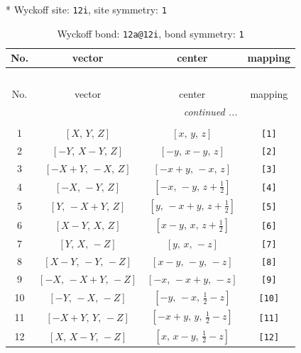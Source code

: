 \documentclass[fleqn,8pt]{jsarticle}
\begin{document}
* Wyckoff site: {\tt 12i}, site symmetry: {\tt 1}
\renewcommand{\arraystretch}{1.2}
\begin{longtable}{cccc}
\caption{Wyckoff bond: {\tt 12a@12i}, bond symmetry: {\tt 1}}
 \\
 \hline \hline
No. & vector & center & mapping \\ \hline \endfirsthead

\multicolumn{3}{l}{\tablename\ \thetable{}} \\
 \hline \hline
No. & vector & center & mapping \\ \hline \endhead

 \hline \hline
\multicolumn{3}{r}{\footnotesize\it continued ...} \\ \endfoot

 \hline \hline
\multicolumn{3}{r}{} \\ \endlastfoot

1 & $\left[ X,\, Y,\, Z \right]$ & $\left[ x,\, y,\, z \right]$ & {\tt [1]} \\ \hline
2 & $\left[ - Y,\, X - Y,\, Z \right]$ & $\left[ - y,\, x - y,\, z \right]$ & {\tt [2]} \\ \hline
3 & $\left[ - X + Y,\, - X,\, Z \right]$ & $\left[ - x + y,\, - x,\, z \right]$ & {\tt [3]} \\ \hline
4 & $\left[ - X,\, - Y,\, Z \right]$ & $\left[ - x,\, - y,\, z + \frac{1}{2} \right]$ & {\tt [4]} \\ \hline
5 & $\left[ Y,\, - X + Y,\, Z \right]$ & $\left[ y,\, - x + y,\, z + \frac{1}{2} \right]$ & {\tt [5]} \\ \hline
6 & $\left[ X - Y,\, X,\, Z \right]$ & $\left[ x - y,\, x,\, z + \frac{1}{2} \right]$ & {\tt [6]} \\ \hline
7 & $\left[ Y,\, X,\, - Z \right]$ & $\left[ y,\, x,\, - z \right]$ & {\tt [7]} \\ \hline
8 & $\left[ X - Y,\, - Y,\, - Z \right]$ & $\left[ x - y,\, - y,\, - z \right]$ & {\tt [8]} \\ \hline
9 & $\left[ - X,\, - X + Y,\, - Z \right]$ & $\left[ - x,\, - x + y,\, - z \right]$ & {\tt [9]} \\ \hline
10 & $\left[ - Y,\, - X,\, - Z \right]$ & $\left[ - y,\, - x,\, \frac{1}{2} - z \right]$ & {\tt [10]} \\ \hline
11 & $\left[ - X + Y,\, Y,\, - Z \right]$ & $\left[ - x + y,\, y,\, \frac{1}{2} - z \right]$ & {\tt [11]} \\ \hline
12 & $\left[ X,\, X - Y,\, - Z \right]$ & $\left[ x,\, x - y,\, \frac{1}{2} - z \right]$ & {\tt [12]} \\
\end{longtable}
\end{document}

